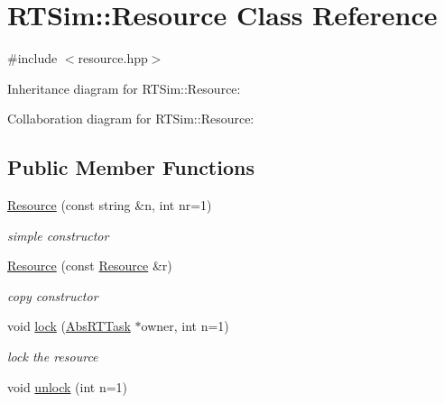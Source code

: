 \hypertarget{classRTSim_1_1Resource}{}\section{R\+T\+Sim\+:\+:Resource Class Reference}
\label{classRTSim_1_1Resource}


{\ttfamily \#include $<$resource.\+hpp$>$}



Inheritance diagram for R\+T\+Sim\+:\+:Resource\+:


Collaboration diagram for R\+T\+Sim\+:\+:Resource\+:
\subsection*{Public Member Functions}
\begin{DoxyCompactItemize}
\item 
\hyperlink{classRTSim_1_1Resource_a8d0cf3becb3c7dde07034ec7829a2e46}{Resource} (const string \&n, int nr=1)\hypertarget{classRTSim_1_1Resource_a8d0cf3becb3c7dde07034ec7829a2e46}{}\label{classRTSim_1_1Resource_a8d0cf3becb3c7dde07034ec7829a2e46}

\begin{DoxyCompactList}\small\item\em simple constructor \end{DoxyCompactList}\item 
\hyperlink{classRTSim_1_1Resource_afb6750a035a62adf669d7f33c24993ba}{Resource} (const \hyperlink{classRTSim_1_1Resource}{Resource} \&r)\hypertarget{classRTSim_1_1Resource_afb6750a035a62adf669d7f33c24993ba}{}\label{classRTSim_1_1Resource_afb6750a035a62adf669d7f33c24993ba}

\begin{DoxyCompactList}\small\item\em copy constructor \end{DoxyCompactList}\item 
void \hyperlink{classRTSim_1_1Resource_a0166bd5745ce30fa2a02953fc8fd05af}{lock} (\hyperlink{classRTSim_1_1AbsRTTask}{Abs\+R\+T\+Task} $\ast$owner, int n=1)\hypertarget{classRTSim_1_1Resource_a0166bd5745ce30fa2a02953fc8fd05af}{}\label{classRTSim_1_1Resource_a0166bd5745ce30fa2a02953fc8fd05af}

\begin{DoxyCompactList}\small\item\em lock the resource \end{DoxyCompactList}\item 
void \hyperlink{classRTSim_1_1Resource_aa70228bd96c89985232c3cd14c1632f5}{unlock} (int n=1)\hypertarget{classRTSim_1_1Resource_aa70228bd96c89985232c3cd14c1632f5}{}\label{classRTSim_1_1Resource_aa70228bd96c89985232c3cd14c1632f5}


\end{DoxyCompactItemize}
